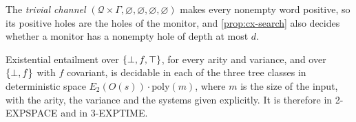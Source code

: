 The \emph{trivial channel} $(\mathcal Q\times\Gamma,\varnothing,\varnothing,
\varnothing,\varnothing)$ makes every nonempty word positive, so its positive
holes are the holes of the monitor, and \cref{prop:cx-search} also decides
whether a monitor has a nonempty hole of depth at most $d$.

\begin{theorem}\label{thm:cx-upper}
Existential entailment over $\{\bot,f,\top\}$, for every arity and variance, and over
$\{\bot,f\}$ with $f$ covariant, is decidable in each of the three tree classes in
deterministic space $E_2(O(s))\cdot\mathrm{poly}(m)$, where $m$ is the size of
the input, with the arity, the variance and the systems given explicitly. It is
therefore in 2-EXPSPACE and in 3-EXPTIME.
\end{theorem}

